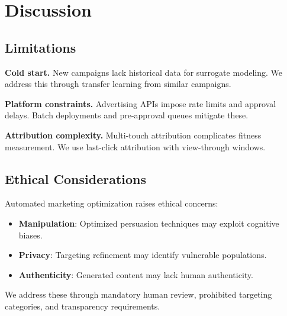 \section{Discussion}


\subsection{Limitations}

\textbf{Cold start.} New campaigns lack historical data for surrogate modeling. We address this through transfer learning from similar campaigns.

\textbf{Platform constraints.} Advertising APIs impose rate limits and approval delays. Batch deployments and pre-approval queues mitigate these.

\textbf{Attribution complexity.} Multi-touch attribution complicates fitness measurement. We use last-click attribution with view-through windows.

\subsection{Ethical Considerations}

Automated marketing optimization raises ethical concerns:

\begin{itemize}
\item \textbf{Manipulation}: Optimized persuasion techniques may exploit cognitive biases.
\item \textbf{Privacy}: Targeting refinement may identify vulnerable populations.
\item \textbf{Authenticity}: Generated content may lack human authenticity.
\end{itemize}

We address these through mandatory human review, prohibited targeting categories, and transparency requirements.

